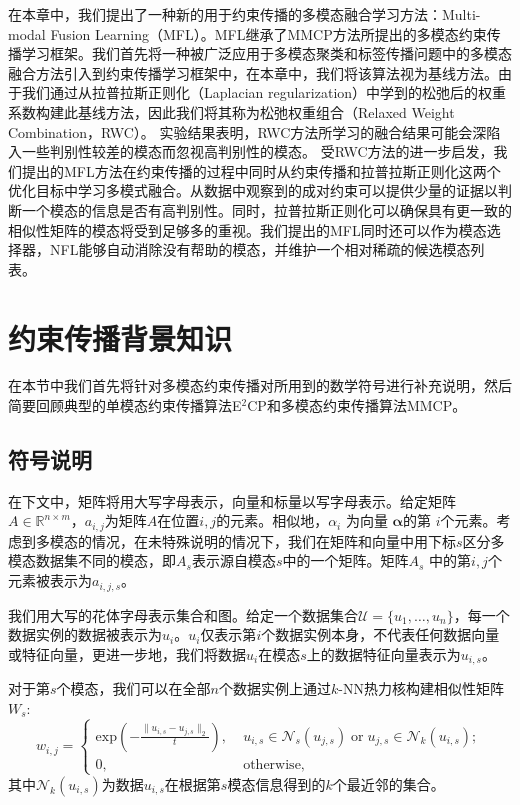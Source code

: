 在本章中，我们提出了一种新的用于约束传播的多模态融合学习方法：Multi-modal Fusion Learning（MFL）。MFL继承了MMCP方法所提出的多模态约束传播学习框架。我们首先将一种被广泛应用于多模态聚类和标签传播问题中的多模态融合方法引入到约束传播学习框架中，在本章中，我们将该算法视为基线方法。由于我们通过从拉普拉斯正则化（Laplacian regularization）中学到的松弛后的权重系数构建此基线方法，因此我们将其称为松弛权重组合（Relaxed Weight Combination，RWC）。
实验结果表明，RWC方法所学习的融合结果可能会深陷入一些判别性较差的模态而忽视高判别性的模态。
受RWC方法的进一步启发，我们提出的MFL方法在约束传播的过程中同时从约束传播和拉普拉斯正则化这两个优化目标中学习多模式融合。从数据中观察到的成对约束可以提供少量的证据以判断一个模态的信息是否有高判别性。同时，拉普拉斯正则化可以确保具有更一致的相似性矩阵的模态将受到足够多的重视。我们提出的MFL同时还可以作为模态选择器，NFL能够自动消除没有帮助的模态，并维护一个相对稀疏的候选模态列表。

\section{约束传播背景知识}
在本节中我们首先将针对多模态约束传播对所用到的数学符号进行补充说明，然后简要回顾典型的单模态约束传播算法E$^2$CP\cite{lu2010constrained}和多模态约束传播算法MMCP\cite{fu2011multi}。
\subsection{符号说明}
在下文中，矩阵将用大写字母表示，向量和标量以写字母表示。给定矩阵$ {A} \in \mathbb{R}^{n\times m}$，$ a_{i,j} $为矩阵$A$在位置$ i,j $的元素。相似地，$ \alpha_{i} $ 为向量 $ \boldsymbol{\alpha} $的第 $ i $个元素。考虑到多模态的情况，在未特殊说明的情况下，我们在矩阵和向量中用下标$s$区分多模态数据集不同的模态，即${A}_s$表示源自模态$s$中的一个矩阵。矩阵$ {A}_s $ 中的第$ i,j $个元素被表示为$a_{i,j,s}$。

我们用大写的花体字母表示集合和图。给定一个数据集合$\mathcal{U} = \{u_1,\dots,u_n \}$，每一个数据实例的数据被表示为$u_i$。$u_i$仅表示第$i$个数据实例本身，不代表任何数据向量或特征向量，更进一步地，我们将数据$u_i$在模态$s$上的数据特征向量表示为$u_{i,s}$。

对于第$s$个模态，我们可以在全部$n$个数据实例上通过$k$-NN热力核构建相似性矩阵$ {W}_s$:
\begin{equation}
w_{i,j} = \begin{cases} \mathrm{exp}(-\frac{\|u_{i,s}-u_{j,s}\|_{2}}{t}), \; &u_{i,s}\in\mathcal{N}_s(u_{j,s})\;\mathrm{or}\; u_{j,s}\in\mathcal{N}_k(u_{i,s});\\
0,&\mathrm{otherwise,}\end{cases}   
\label{eq3:GaussKer}                              
\end{equation}
其中$\mathcal{N}_k(u_{i,s})$为数据$u_{i,s}$在根据第$s$模态信息得到的$k$个最近邻的集合。

